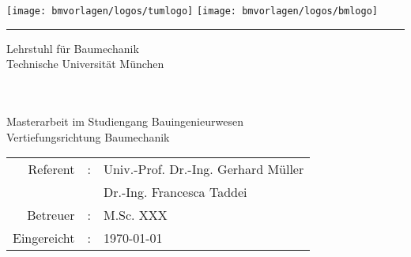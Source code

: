 {
\begin{titlepage}

\begin{center}
{
\fontsize{18}{18}\selectfont 

\texttt{[image: bmvorlagen/logos/tumlogo]} \hfill \texttt{[image: bmvorlagen/logos/bmlogo]}
\vspace{0.5cm}
\hrule

\vspace{1cm}
Lehrstuhl für Baumechanik\\
Technische Universität München\\

\vspace{1.4cm}

\vspace{2cm}


\vspace{3mm}



\bmtitle \\[5ex]


\bmauthor \\[7ex]


Masterarbeit im Studiengang Bauingenieurwesen\\
Vertiefungsrichtung Baumechanik\\

\vspace{1.8cm}

{\fontsize{12pt}{12} \selectfont%
\begin{tabular}{rll}
Referent&:& Univ.-Prof. Dr.-Ing. Gerhard Müller\\
& & Dr.-Ing. Francesca Taddei\\[0.5ex]
Betreuer&:& M.Sc. XXX\\[0.5ex]
Eingereicht&:& \today
\end{tabular}
}
                  

}
\end{center}

\end{titlepage}
}
